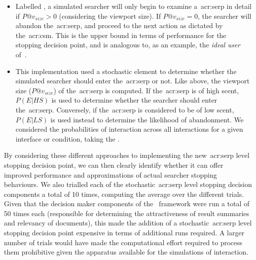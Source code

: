 \begin{itemize}
    \item{ Labelled , a simulated searcher will only begin to examine a~\gls{acr:serp} in detail if $P@v_{size} > 0$ (considering the viewport size). If $P@v_{size} = 0$, the searcher will abandon the~\gls{acr:serp}, and proceed to the next action as dictated by the~\gls{acr:csm}. This is the upper bound in terms of performance for the stopping decision point, and is analogous to, as an example, the \emph{ideal user} of~\cite{hagen2016simulating_users}.}
    
    \item{ This implementation used a stochastic element to determine whether the simulated searcher should enter the~\gls{acr:serp} or not. Like above, the viewport size ($P@v_{size}$) of the~\gls{acr:serp} is computed. If the~\gls{acr:serp} is of high scent, $P(E|HS)$ is used to determine whether the searcher should enter the~\gls{acr:serp}. Conversely, if the~\gls{acr:serp} is considered to be of low scent, $P(E|LS)$ is used instead to determine the likelihood of abandonment. We considered the probabilities of interaction across all interactions for a given interface or condition, taking the .}
    
%
\end{itemize}

By considering these different approaches to implementing the new~\gls{acr:serp} level stopping decision point, we can then clearly identify whether it can offer improved performance and approximations of actual searcher stopping behaviours. We also trialled each of the stochastic~\gls{acr:serp} level stopping decision components a total of 10 times, computing the average over the different trials. Given that the decision maker components of the \simiir~framework were run a total of 50 times each (responsible for determining the attractiveness of result summaries and relevancy of documents), this made the addition of a stochastic~\gls{acr:serp} level stopping decision point expensive in terms of additional runs required. A larger number of trials would have made the computational effort required to process them prohibitive given the apparatus available for the simulations of interaction.

